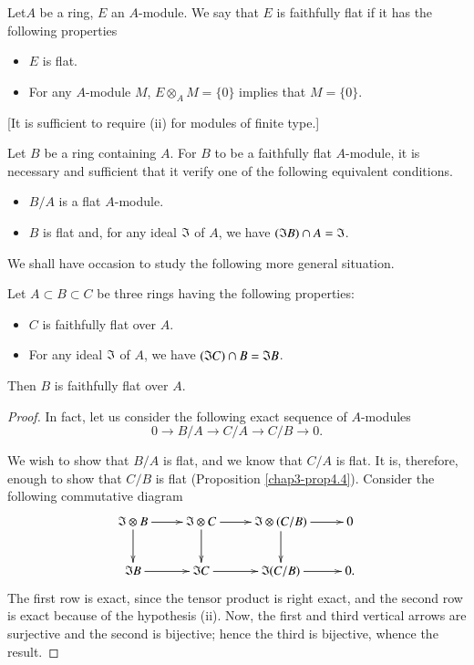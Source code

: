 \begin{definition}\label{chap3-defi4.6}
Let\pageoriginale $A$ be a ring, $E$ an $A$-module. We say that $E$ is faithfully flat if it has the following properties
\begin{itemize}
\item[\rm(i)] $E$ is flat.

\item[\rm(ii)] For any $A$-module $M$, $E\otimes_A M=\{0\}$ implies that $M=\{0\}$.
\end{itemize}
\end{definition}
[It is sufficient to require (ii) for modules of finite type.]

Let $B$ be a ring containing $A$. For $B$ to be a faithfully flat $A$-module, it is necessary and sufficient that it verify one of the following equivalent conditions.
\begin{itemize}
\item[(i)] $B/A$ is a flat $A$-module.

\item[(ii)] $B$ is flat and, for any ideal $\mathfrak{I}$ of $A$, we have $(\mathfrak{I} B)\cap A=\mathfrak{I}$.
\end{itemize}

We shall have occasion to study the following more general situation.

\begin{proposition}\label{chap3-prop4.7}
Let $A\subset B\subset C$ be three rings having the following properties:
\begin{itemize}
\item[\rm(i)] $C$ is faithfully flat over $A$.

\item[\rm(ii)] For any ideal $\mathfrak{I}$ of $A$, we have $(\mathfrak{I} C)\cap B=\mathfrak{I} B$.
\end{itemize}
Then $B$ is faithfully flat over $A$.
\end{proposition}

\begin{proof}
In fact, let us consider the following exact sequence of $A$-modules
$$
0\to B/A\to C/A\to C/B\to 0.
$$

We wish to show that $B/A$ is flat, and we know that $C/A$ is flat. It is, therefore, enough to show that $C/B$ is flat (Proposition \ref{chap3-prop4.4}). Consider the following commutative diagram
\[
\xymatrix{
\frakI\otimes B\ar[d]\ar[r] & \frakI\otimes C\ar[d]\ar[r] & \frakI\otimes (C/B)\ar[d]\ar[r] & 0\\
\frakI B\ar[r] & \frakI C\ar[r] & \frakI (C/B)\ar[r] & 0.
}
\]
The first row is exact, since the tensor product is right exact, and the second row is exact because of the hypothesis (ii). Now, the first and third vertical arrows are surjective and the second is bijective; hence the third is bijective, whence the result.
\end{proof}

